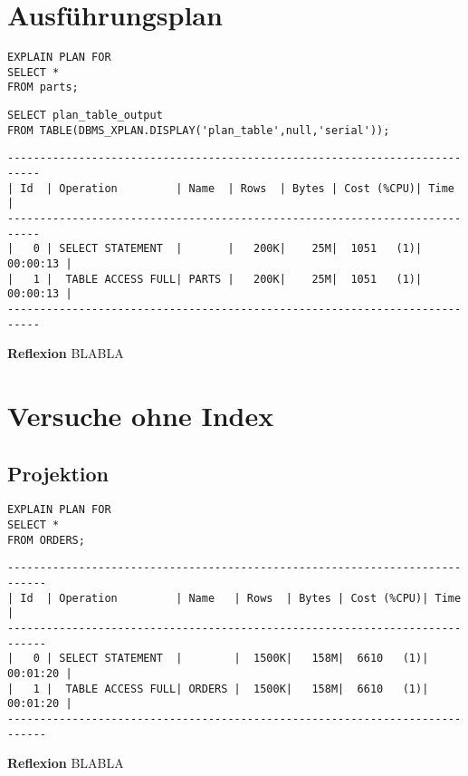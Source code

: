 \documentclass[10pt]{article}
\begin{document}
\section{Ausführungsplan}
\begin{lstlisting}[style=sql]
EXPLAIN PLAN FOR
SELECT *
FROM parts;
\end{lstlisting}
\begin{lstlisting}[style=sql]
SELECT plan_table_output
FROM TABLE(DBMS_XPLAN.DISPLAY('plan_table',null,'serial'));
\end{lstlisting}
\begin{lstlisting}[style=queryexecutionplan]
---------------------------------------------------------------------------
| Id  | Operation         | Name  | Rows  | Bytes | Cost (%CPU)| Time     |
---------------------------------------------------------------------------
|   0 | SELECT STATEMENT  |       |   200K|    25M|  1051   (1)| 00:00:13 |
|   1 |  TABLE ACCESS FULL| PARTS |   200K|    25M|  1051   (1)| 00:00:13 |
---------------------------------------------------------------------------
\end{lstlisting}
\textbf{Reflexion} \newline
BLABLA

\section{Versuche ohne Index}
\subsection{Projektion}
\begin{lstlisting}[style=sql]
EXPLAIN PLAN FOR
SELECT *
FROM ORDERS;
\end{lstlisting}
\begin{lstlisting}[style=queryexecutionplan]
----------------------------------------------------------------------------
| Id  | Operation         | Name   | Rows  | Bytes | Cost (%CPU)| Time     |
----------------------------------------------------------------------------
|   0 | SELECT STATEMENT  |        |  1500K|   158M|  6610   (1)| 00:01:20 |
|   1 |  TABLE ACCESS FULL| ORDERS |  1500K|   158M|  6610   (1)| 00:01:20 |
----------------------------------------------------------------------------
\end{lstlisting}
\textbf{Reflexion} \newline
BLABLA
\end{document}
